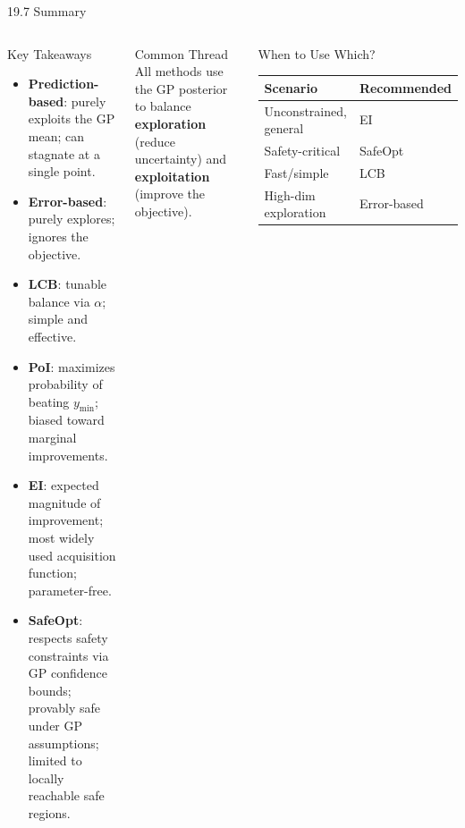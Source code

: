 \documentclass[aspectratio=169,10pt]{beamer}
\begin{document}
\begin{frame}{19.7 Summary}
  \begin{columns}[T]
      \begin{block}{Key Takeaways}
        \begin{itemize}
          \item \textbf{Prediction-based}: purely exploits the GP mean;
                can stagnate at a single point.
          \item \textbf{Error-based}: purely explores; ignores the objective.
          \item \textbf{LCB}: tunable balance via $\alpha$; simple and effective.
          \item \textbf{PoI}: maximizes probability of beating $y_{\min}$;
                biased toward marginal improvements.
          \item \textbf{EI}: expected magnitude of improvement;
                most widely used acquisition function; parameter-free.
          \item \textbf{SafeOpt}: respects safety constraints via GP confidence
                bounds; provably safe under GP assumptions; limited to
                locally reachable safe regions.
        \end{itemize}
      \end{block}
      \begin{alertblock}{Common Thread}
        All methods use the GP posterior to balance
        \textbf{exploration} (reduce uncertainty) and
        \textbf{exploitation} (improve the objective).
      \end{alertblock}
      \begin{block}{When to Use Which?}
        \begin{tabular}{lp{3.2cm}}
          \toprule
          Scenario & Recommended \\
          \midrule
          Unconstrained, general & EI \\
          Safety-critical & SafeOpt \\
          Fast/simple & LCB \\
          High-dim exploration & Error-based \\
          \bottomrule
        \end{tabular}
      \end{block}
  \end{columns}
\end{frame}
\end{document}
